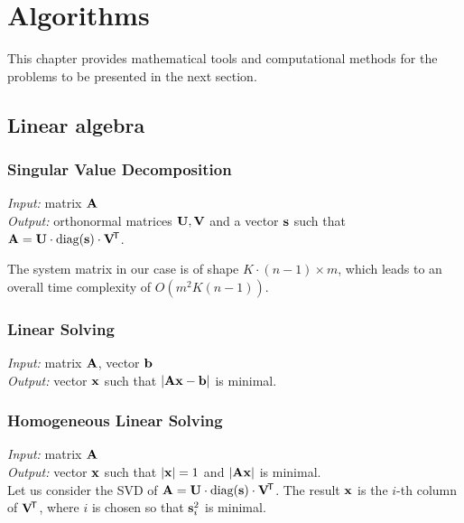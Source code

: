 \chapter{Algorithms}

This chapter provides mathematical tools and computational methods for the problems to be presented in the next section.

\section{Linear algebra}

\subsection{Singular Value Decomposition}
\textit{Input:} matrix $\mathbf{A}$\\
\textit{Output:} orthonormal matrices $\mathbf{U}, \mathbf{V}$ and a vector $\mathbf{s}$ such that $\mathbf{A} = \mathbf{U} \cdot \textrm{diag}(\mathbf{s}) \cdot \mathbf{V}^{\!\mathsf{T}}$.\\


The system matrix in our case is of shape $K \cdot (n - 1) \times m$, which leads to an overall time complexity of $O(m^2 K (n - 1))$.

\subsection{Linear Solving}
\textit{Input:} matrix $\mathbf{A}$, vector $\mathbf{b}$\\
\textit{Output:} vector $\mathbf{x}$ such that $|\mathbf{A} \mathbf{x} - \mathbf{b}|$ is minimal.\\

\todo{\dots}

\subsection{Homogeneous Linear Solving}
\textit{Input:} matrix $\mathbf{A}$\\
\textit{Output:} vector $\mathbf{x}$ such that $|\mathbf{x}| = 1$ and $|\mathbf{A} \mathbf{x}|$ is minimal.\\

Let us consider the SVD of $\mathbf{A} = \mathbf{U} \cdot \textrm{diag}(\mathbf{s}) \cdot \mathbf{V}^{\!\mathsf{T}}$.
The result $\mathbf{x}$ is the $i$-th column of $\mathbf{V} ^{\!\mathsf{T}}$, where $i$ is chosen so that $\mathbf{s}_i^2$ is minimal.

